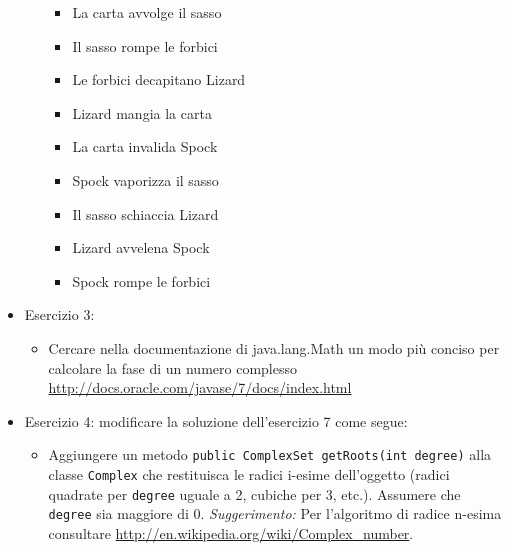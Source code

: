 \documentclass{article}
\begin{document}
\begin{itemize}
\begin{itemize}
\begin{itemize}
			\item La carta avvolge il sasso
			\item Il sasso rompe le forbici
			\item Le forbici decapitano Lizard
			\item Lizard mangia la carta
			\item La carta invalida Spock
			\item Spock vaporizza il sasso
			\item Il sasso schiaccia Lizard
			\item Lizard avvelena Spock
			\item Spock rompe le forbici
	\end{itemize}
\end{itemize}
\item Esercizio 3:
\begin{itemize}
\item Cercare nella documentazione di java.lang.Math un modo pi\`u conciso per calcolare la fase di un numero complesso
\url{http://docs.oracle.com/javase/7/docs/index.html}
\end{itemize}
\item Esercizio 4: modificare la soluzione dell'esercizio 7 come segue:
\begin{itemize}
	\item Aggiungere un metodo \texttt{public ComplexSet getRoots(int degree)} alla classe \texttt{Complex}
	che restituisca le radici i-esime dell'oggetto (radici quadrate per \texttt{degree} uguale a 2, cubiche per 3, etc.).
	Assumere che \texttt{degree} sia maggiore di 0.
	\emph{Suggerimento:} Per l'algoritmo di radice n-esima consultare \url{http://en.wikipedia.org/wiki/Complex_number}.
\end{itemize}
\end{itemize}

\clearpage







\nocite{*}
\end{document}
